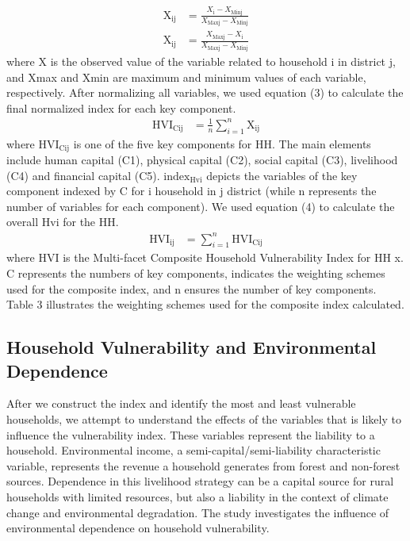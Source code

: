 \begin{align}
	\text{X}_{\text{ij}} &= \frac{X_{\text{i}} - X_{\text{Minj}}}{X_{\text{Maxj}} - X_{\text{Minj}}} \tag{1} \\[1cm] 	
	\text{X}_{\text{ij}} &= \frac{X_{\text{Maxj}} - X_{\text{i}}}{X_{\text{Maxj}} - X_{\text{Minj}}} \tag{2}
\end{align} 
where X is the observed value of the variable related to household i in district j, and Xmax and Xmin are 
maximum and minimum values of each variable, respectively. After normalizing all variables, 
we used equation (3) to calculate the final normalized index for each key component.
\begin{align}
	\text{HVI}_{\text{Cij}} &= \frac{1}{n}\sum_{i=1}^{n}\text{X}_{\text{ij}} \tag{3}
\end{align}
where $\text{HVI}_{\text{Cij}}$ is one of the five key components for HH. The main elements include human capital (C1), physical capital (C2), social capital (C3), livelihood (C4) and financial capital (C5). 	$\text{index}_{\text{Hvi}}$
depicts the variables of the key component indexed by C for i household in j district (while n represents the number of variables for each component). We used equation (4) to 
calculate the overall Hvi for the HH.
\begin{align}
	\text{HVI}_{\text{ij}} &= \sum_{i=1}^{n}\text{HVI}_{\text{Cij}} \tag{4}
\end{align}
where HVI is the Multi-facet Composite Household Vulnerability Index for HH x. 
C represents the numbers of key components,  indicates the weighting schemes used for the 
composite index, and n ensures the number of key components. Table 3 illustrates the weighting 
schemes used for the composite index calculated.\par 
                                   
\subsection{Household Vulnerability and Environmental Dependence}
After we construct the index and identify the most and least vulnerable households, we attempt to understand the effects of the variables that is likely to influence the vulnerability index. These variables represent the liability to a household. Environmental income, a semi-capital/semi-liability characteristic variable, represents the revenue a household generates from forest and non-forest sources. Dependence in this livelihood strategy can be a capital source for rural households with limited resources, but also a liability in the context of climate change and environmental degradation. The study investigates the influence of environmental dependence on household vulnerability.\par

